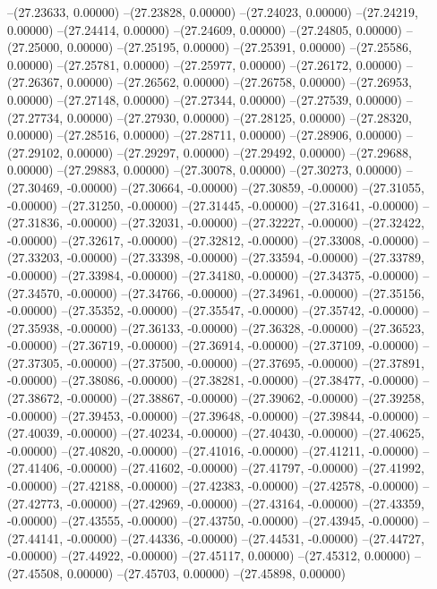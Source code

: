 --(27.23633, 0.00000)
--(27.23828, 0.00000)
--(27.24023, 0.00000)
--(27.24219, 0.00000)
--(27.24414, 0.00000)
--(27.24609, 0.00000)
--(27.24805, 0.00000)
--(27.25000, 0.00000)
--(27.25195, 0.00000)
--(27.25391, 0.00000)
--(27.25586, 0.00000)
--(27.25781, 0.00000)
--(27.25977, 0.00000)
--(27.26172, 0.00000)
--(27.26367, 0.00000)
--(27.26562, 0.00000)
--(27.26758, 0.00000)
--(27.26953, 0.00000)
--(27.27148, 0.00000)
--(27.27344, 0.00000)
--(27.27539, 0.00000)
--(27.27734, 0.00000)
--(27.27930, 0.00000)
--(27.28125, 0.00000)
--(27.28320, 0.00000)
--(27.28516, 0.00000)
--(27.28711, 0.00000)
--(27.28906, 0.00000)
--(27.29102, 0.00000)
--(27.29297, 0.00000)
--(27.29492, 0.00000)
--(27.29688, 0.00000)
--(27.29883, 0.00000)
--(27.30078, 0.00000)
--(27.30273, 0.00000)
--(27.30469, -0.00000)
--(27.30664, -0.00000)
--(27.30859, -0.00000)
--(27.31055, -0.00000)
--(27.31250, -0.00000)
--(27.31445, -0.00000)
--(27.31641, -0.00000)
--(27.31836, -0.00000)
--(27.32031, -0.00000)
--(27.32227, -0.00000)
--(27.32422, -0.00000)
--(27.32617, -0.00000)
--(27.32812, -0.00000)
--(27.33008, -0.00000)
--(27.33203, -0.00000)
--(27.33398, -0.00000)
--(27.33594, -0.00000)
--(27.33789, -0.00000)
--(27.33984, -0.00000)
--(27.34180, -0.00000)
--(27.34375, -0.00000)
--(27.34570, -0.00000)
--(27.34766, -0.00000)
--(27.34961, -0.00000)
--(27.35156, -0.00000)
--(27.35352, -0.00000)
--(27.35547, -0.00000)
--(27.35742, -0.00000)
--(27.35938, -0.00000)
--(27.36133, -0.00000)
--(27.36328, -0.00000)
--(27.36523, -0.00000)
--(27.36719, -0.00000)
--(27.36914, -0.00000)
--(27.37109, -0.00000)
--(27.37305, -0.00000)
--(27.37500, -0.00000)
--(27.37695, -0.00000)
--(27.37891, -0.00000)
--(27.38086, -0.00000)
--(27.38281, -0.00000)
--(27.38477, -0.00000)
--(27.38672, -0.00000)
--(27.38867, -0.00000)
--(27.39062, -0.00000)
--(27.39258, -0.00000)
--(27.39453, -0.00000)
--(27.39648, -0.00000)
--(27.39844, -0.00000)
--(27.40039, -0.00000)
--(27.40234, -0.00000)
--(27.40430, -0.00000)
--(27.40625, -0.00000)
--(27.40820, -0.00000)
--(27.41016, -0.00000)
--(27.41211, -0.00000)
--(27.41406, -0.00000)
--(27.41602, -0.00000)
--(27.41797, -0.00000)
--(27.41992, -0.00000)
--(27.42188, -0.00000)
--(27.42383, -0.00000)
--(27.42578, -0.00000)
--(27.42773, -0.00000)
--(27.42969, -0.00000)
--(27.43164, -0.00000)
--(27.43359, -0.00000)
--(27.43555, -0.00000)
--(27.43750, -0.00000)
--(27.43945, -0.00000)
--(27.44141, -0.00000)
--(27.44336, -0.00000)
--(27.44531, -0.00000)
--(27.44727, -0.00000)
--(27.44922, -0.00000)
--(27.45117, 0.00000)
--(27.45312, 0.00000)
--(27.45508, 0.00000)
--(27.45703, 0.00000)
--(27.45898, 0.00000)
